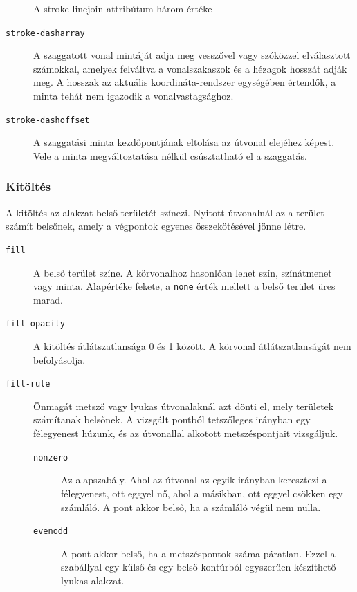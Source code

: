 \begin{figure}[H]
    \centering
    
    \caption{A stroke-linejoin attribútum három értéke}
    \label{fig:example_stroke-linejoin}
\end{figure}

\begin{description}
\item[\texttt{stroke-dasharray}] A szaggatott vonal mintáját adja meg vesszővel vagy szóközzel elválasztott számokkal, amelyek felváltva a vonalszakaszok és a hézagok hosszát adják meg. A hosszak az aktuális koordináta-rendszer egységében értendők, a minta tehát nem igazodik a vonalvastagsághoz.
\item[\texttt{stroke-dashoffset}] A szaggatási minta kezdőpontjának eltolása az útvonal elejéhez képest. Vele a minta megváltoztatása nélkül csúsztatható el a szaggatás.
\end{description}

\subsubsection{Kitöltés}

A kitöltés az alakzat belső területét színezi. Nyitott útvonalnál az a terület számít belsőnek, amely a végpontok egyenes összekötésével jönne létre.

\begin{description}
\item[\texttt{fill}] A belső terület színe. A körvonalhoz hasonlóan lehet szín, színátmenet vagy minta. Alapértéke fekete, a \texttt{none} érték mellett a belső terület üres marad.
\item[\texttt{fill-opacity}] A kitöltés átlátszatlansága 0 és 1 között. A körvonal átlátszatlanságát nem befolyásolja.
\item[\texttt{fill-rule}] Önmagát metsző vagy lyukas útvonalaknál azt dönti el, mely területek számítanak belsőnek. A vizsgált pontból tetszőleges irányban egy félegyenest húzunk, és az útvonallal alkotott metszéspontjait vizsgáljuk.
\begin{description}
    \item[\texttt{nonzero}] Az alapszabály. Ahol az útvonal az egyik irányban keresztezi a félegyenest, ott eggyel nő, ahol a másikban, ott eggyel csökken egy számláló. A pont akkor belső, ha a számláló végül nem nulla.
    \item[\texttt{evenodd}] A pont akkor belső, ha a metszéspontok száma páratlan. Ezzel a szabállyal egy külső és egy belső kontúrból egyszerűen készíthető lyukas alakzat.
\end{description}
\end{description}

